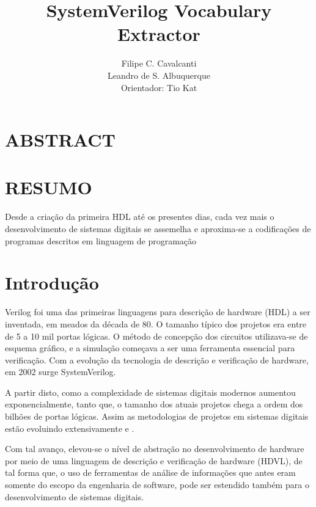 \documentclass[12pt, twocolumn, a4paper]{article}
\begin{document}
	\title{SystemVerilog Vocabulary Extractor}
	\author{Filipe C. Cavalcanti\\ Leandro de S. Albuquerque\\
	Orientador: Tio Kat}
	\maketitle
	
	\section{ABSTRACT}
	
	\section{RESUMO}
	\quad Desde a criação da primeira HDL até os presentes dias, cada vez mais o desenvolvimento de sistemas digitais se assemelha e aproxima-se a codificações de programas descritos em linguagem de programação  
	
	\section{Introdução}

\quad Verilog foi uma das primeiras linguagens para descrição de hardware (HDL) a ser inventada, em meados da década de 80. O tamanho típico dos projetos era entre de 5 a 10 mil portas lógicas. O método de concepção dos circuitos utilizava-se de esquema gráfico, e a simulação começava a ser uma ferramenta essencial para verificação\cite{sutherland2006}. Com a evolução da tecnologia de descrição e verificação de hardware, em 2002 surge SystemVerilog. 

A partir disto, como a complexidade de sistemas digitais modernos aumentou exponencialmente, tanto que, o tamanho dos atuais projetos chega a ordem dos bilhões de portas lógicas. Assim as metodologias de projetos em sistemas digitais estão evoluindo extensivamente \cite{Marc-Andre} e \cite{Hahanov2008}.

Com tal avanço, elevou-se o nível de abstração no desenvolvimento de hardware por meio de uma linguagem de descrição e verificação de hardware (HDVL), de tal forma que, o uso de ferramentas de análise de informações que antes eram somente do escopo da engenharia de software, pode ser estendido também para o desenvolvimento de sistemas digitais.
\end{document}
